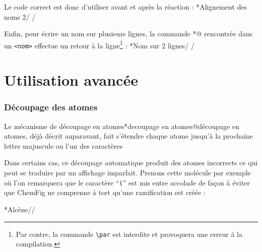 \documentclass[10pt]{article}
\makeatletter
\newcommand\idx{\@ifstar{\let\print@or@not\@gobble\idx@}{\let\print@or@not\@firstofone\idx@}}
\newcommand\idx@[1]{%
	\ifcat\expandafter\noexpand\@car#1\@nil\relax%
		\expandafter\ifx\@car#1\@nil\protect
			\index{#1}%
			\print@or@not{#1}%
		\else
			\saveexpandmode\expandarg
			\StrSubstitute{\string#1}{\string @}{\@empty\protect\symbol{'100}}[\temp@]%
			\StrGobbleLeft\temp@1[\temp@]%
			\restoreexpandmode
			\expandafter\index\expandafter{\temp@ @\protect\texttt{\protect\textbackslash\temp@}}%
			\print@or@not{\texttt{\string#1}}%
		\fi
	\else
		\index{#1}%
		\print@or@not{#1}%
	\fi
}
\newcommand\make@car@active[2]{%
	\catcode`#1\active
	\begingroup
		\lccode`\~`#1\relax
		\lowercase{\endgroup\def~{#2}}%
}
\newif\if@exstar
\newcommand\exemple{%
	\begingroup
	\parskip\z@
	\@makeother\;\@makeother\!\@makeother\?\@makeother\:%
	\@ifstar{\@exstartrue\exemple@}{\@exstarfalse\exemple@}}
\newcommand\exemple@[2][65]{%
	\medbreak\noindent
	\begingroup
		\let\do\@makeother\dospecials
		\make@car@active\ { {}}%
		\make@car@active\^^M{\par\leavevmode}%
		\make@car@active\,{\leavevmode\kern\z@\string,}%
		\make@car@active\-{\leavevmode\kern\z@\string-}%
		\make@car@active\>{\leavevmode\kern\z@\string>}%
		\make@car@active\<{\leavevmode\kern\z@\string<}%
		\exemple@@{#1}{#2}%
}
\newcommand\exemple@@[3]{%
	\def\@tempa##1#3{\exemple@@@{#1}{#2}{##1}}%
	\@tempa
}
\newcommand\exemple@@@[3]{%
	\xdef\the@code{#3}%
	\endgroup
	\if@exstar
		\begingroup
			\fboxrule0.4pt
			\let\breakboxparindent\z@
			\def\bkvz@bottom{\hrule\@height\fboxrule}%
			\let\bkvz@before@breakbox\relax
			\def\bkvz@set@linewidth{\advance\linewidth\dimexpr-2\fboxrule-2\fboxsep}%
			\def\bkvz@left{\vrule\@width\fboxrule\hskip\fboxsep}%
			\def\bkvz@right{\hskip\fboxsep\vrule\@width\fboxrule}%
			\def\bkvz@top{\hbox to \hsize{%
				\vrule\@width\fboxrule\@height\fboxrule
				\leaders\bkvz@bottom\hfill
				\ECFAugie
				\fboxsep\z@
				\colorbox{black}{\kern0.25em\color{white}\footnotesize\lower0.5ex\hbox{\strut#2}\kern0.25em}%
				\leaders\bkvz@bottom\hfill
				\vrule\@width\fboxrule\@height\fboxrule}}%
			\breakbox
				\kern.5ex\relax
				\ttfamily\footnotesize\the@code\par
				\normalfont
				\kern3pt
				\hrule height0.1pt width\linewidth depth0.1pt
				\vskip5pt
				\rightskip0pt plus 1fill
				\everypar{{\color{lightgray}\rlap{\vrule height0.1pt width\linewidth depth0.1pt}}\hskip0pt plus 1fill}%
				\newlinechar`\^^M\everyeof{\noexpand}\scantokens{#3}\par
			\endbreakbox
		\endgroup
	\else
		\vskip0.5ex
		\boxput*(0,1)
			{\fboxsep\z@
			\hbox{\ECFAugie\colorbox{black}{\leavevmode\kern0.25em{\color{white}\footnotesize\strut#2}\kern0.25em}}%
			}%
			{\fboxsep5pt
			\fbox{%
				$\vcenter{\hsize\dimexpr0.#1\linewidth-\fboxsep-\fboxrule\relax
					\kern5pt\parskip0pt \ttfamily\footnotesize\the@code}%
				\vcenter{\kern5pt\hsize\dimexpr\linewidth-0.#1\linewidth-\fboxsep-\fboxrule\relax
					\everypar{{\color{lightgray}\rlap{\vrule height0.1pt width\dimexpr\linewidth-0.#1\linewidth-\fboxsep-\fboxrule depth0.1pt}}}%
					\footnotesize\newlinechar`\^^M\everyeof{\noexpand}\scantokens{#3}}$%
				}%
			}%
	\fi
	\medbreak
	\endgroup
}
\newcommand\falseverb[1]{{\ttfamily\detokenize{#1}}}
\let\do\@makeother\dospecials
\newcommand\CF{{\ECFAugie ChemFig}\xspace}
\newcommand\boxedfalseverb[1]{{\fboxsep0pt\fbox{\vphantom|\falseverb{#1}}}}
\makeatother
\begin{document}
Le code correct est donc d'utiliser \idx{\chemnameinit} avant et après la réaction :
\exemple*{Alignement des noms 2}/
\chemsign{+}
\chemrel{->}
\chemsign{+}
\chemnameinit{}/

Enfin, pour écrire un nom sur plusieurs lignes, la commande \idx*{\protect{}\protect{}@\protect\texttt{\protect{}\protect{}}} rencontrée dans un \verb-<nom>- effectue un retour à la ligne\footnote{Par contre, la commande \texttt{\textbackslash par} est interdite et provoquera une erreur à la compilation.} :
\exemple*{Nom sur 2 lignes}/
\chemsign{+}
\chemrel{->}
\chemsign{+}
\chemnameinit{}/
\newpage

\part{Utilisation avancée}\label{utilisation.avancee}
\section{Découpage des atomes}\label{decoupage.atomes}
Le mécanisme de découpage en atomes\idx*{decoupage en atomes@découpage en atomes}, déjà décrit auparavant, fait s'étendre chaque atome jusqu'à la prochaine lettre majuscule ou l'un des caractères {\ttfamily \boxedfalseverb{-} \boxedfalseverb{=} \boxedfalseverb{~} \boxedfalseverb{(} \boxedfalseverb{!} \boxedfalseverb{*} \boxedfalseverb{<} \boxedfalseverb{>} \boxedfalseverb{@}}

Dans certains cas, ce découpage automatique produit des atomes incorrects ce qui peut se traduire par un affichage imparfait. Prenons cette molécule par exemple où l'on remarquera que le caractère ``\texttt('' est mis entre accolade de façon à éviter que \CF ne comprenne à tort qu'une ramification est créée :

\exemple*{Alcène}//
\end{document}
